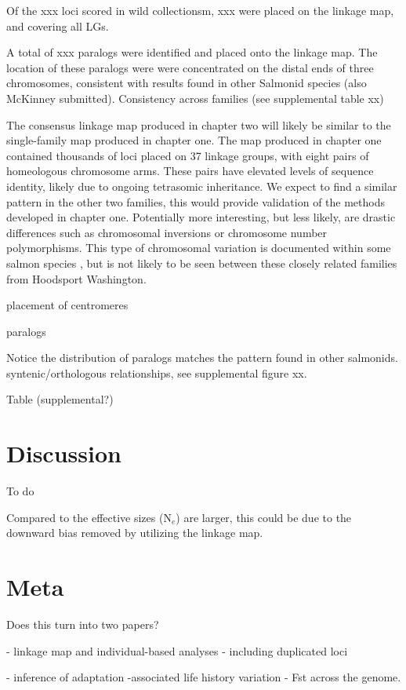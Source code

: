 \documentclass[12pt, one column]{article}
\begin{document}
Of the xxx loci scored in wild collectionsm, xxx were placed on the linkage map, and covering all LGs. 

A total of xxx paralogs were identified and placed onto the linkage map.  The location of these paralogs were were concentrated on the distal ends of three chromosomes, consistent with results found in other Salmonid species  \citep{Brieuc2014, Kodama2014, Waples2015} (also McKinney submitted). Consistency across families (see supplemental table xx)

The consensus linkage map produced in chapter two will likely be similar to the single-family map produced in chapter one.  The map produced in chapter one contained thousands of loci placed on 37 linkage groups, with eight pairs of homeologous chromosome arms.  These pairs have elevated levels of sequence identity, likely due to ongoing tetrasomic inheritance.  We expect to find a similar pattern in the other two families, this would provide validation of the methods developed in chapter one. Potentially more interesting, but less likely, are drastic differences such as chromosomal inversions or chromosome number polymorphisms.  This type of chromosomal variation is documented within some salmon species \citep{Phillips2001}, but is not likely to be seen between these closely related families from Hoodsport Washington.

placement of centromeres

paralogs

Notice the distribution of paralogs matches the  pattern found in other salmonids.
syntenic/orthologous relationships, see supplemental figure xx.

Table (supplemental?)

\section*{Discussion}
To do

Compared to \citet{Small2014} the effective sizes (N$_{e}$) are larger, this could be due to the downward bias removed by utilizing the linkage map.

\section*{Meta}
Does this turn into two papers?

 - linkage map and individual-based analyses - including duplicated loci

 - inference of adaptation -associated  life history variation  - Fst across the genome.
\end{document}
